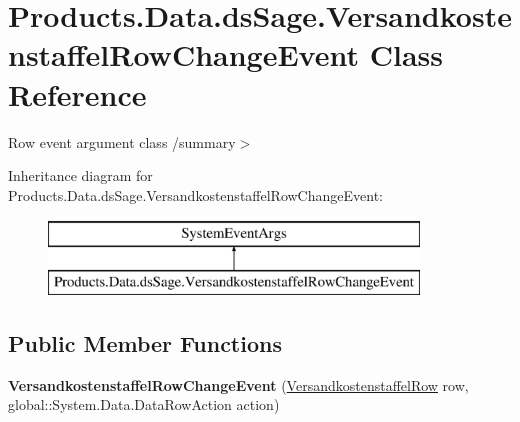 \hypertarget{class_products_1_1_data_1_1ds_sage_1_1_versandkostenstaffel_row_change_event}{}\section{Products.\+Data.\+ds\+Sage.\+Versandkostenstaffel\+Row\+Change\+Event Class Reference}
\label{class_products_1_1_data_1_1ds_sage_1_1_versandkostenstaffel_row_change_event}


Row event argument class /summary$>$  


Inheritance diagram for Products.\+Data.\+ds\+Sage.\+Versandkostenstaffel\+Row\+Change\+Event\+:\begin{figure}[H]
\begin{center}
\leavevmode
\includegraphics[height=2.000000cm]{class_products_1_1_data_1_1ds_sage_1_1_versandkostenstaffel_row_change_event}
\end{center}
\end{figure}
\subsection*{Public Member Functions}
\begin{DoxyCompactItemize}
\item 
{\bfseries Versandkostenstaffel\+Row\+Change\+Event} (\hyperlink{class_products_1_1_data_1_1ds_sage_1_1_versandkostenstaffel_row}{Versandkostenstaffel\+Row} row, global\+::\+System.\+Data.\+Data\+Row\+Action action)\hypertarget{class_products_1_1_data_1_1ds_sage_1_1_versandkostenstaffel_row_change_event_ae0bb45ca9db564cd701a1e7c64b66f08}{}\label{class_products_1_1_data_1_1ds_sage_1_1_versandkostenstaffel_row_change_event_ae0bb45ca9db564cd701a1e7c64b66f08}

\end{DoxyCompactItemize}
